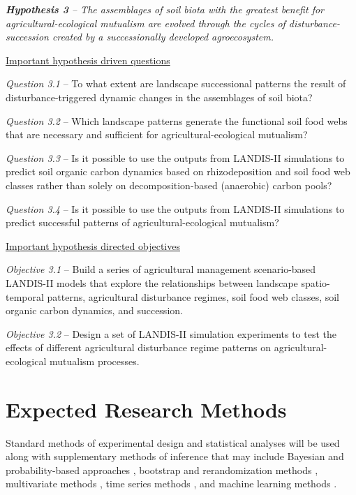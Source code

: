 \begin{description}
	
	\item{\textit{\textbf{Hypothesis 3} -- The assemblages of soil biota with the greatest benefit for agricultural-ecological mutualism are evolved through the cycles of disturbance-succession created by a successionally developed agroecosystem.}}
	
	\underline{Important hypothesis driven questions}
	\begin{description}
		\item{\textit{Question 3.1} -- To what extent are landscape successional patterns the result of disturbance-triggered dynamic changes in the assemblages of soil biota?}
		\item{\textit{Question 3.2} -- Which landscape patterns generate the functional soil food webs that are necessary and sufficient for agricultural-ecological mutualism?}
		\item{\textit{Question 3.3} -- Is it possible to use the outputs from LANDIS-II simulations to predict soil organic carbon dynamics based on rhizodeposition and soil food web classes rather than solely on decomposition-based (anaerobic) carbon pools?}
		\item{\textit{Question 3.4} -- Is it possible to use the outputs from LANDIS-II simulations to predict successful patterns of agricultural-ecological mutualism?}
	\end{description}
	
	\underline{Important hypothesis directed objectives}
	\begin{description}
	\item{\textit{Objective 3.1} -- Build a series of agricultural management scenario-based LANDIS-II models that explore the relationships between landscape spatio-temporal patterns, agricultural disturbance regimes, soil food web classes, soil organic carbon dynamics, and succession.}
	\item{\textit{Objective 3.2} -- Design a set of LANDIS-II simulation experiments to test the effects of different agricultural disturbance regime patterns on agricultural-ecological mutualism processes.}	
	\end{description}

\end{description}

\section{Expected Research Methods}
Standard methods of experimental design \citep{montgomery_design_2013} and statistical analyses \citep{R_computing} will be used along with supplementary methods of inference that may include Bayesian and probability-based approaches \citep{hoff_first_2009, lunn_bugs_2013, jaynes_probability_2003}, bootstrap and rerandomization methods \citep {lunneborg_data_2000}, multivariate methods \citep{johnson_applied_2007}, time series methods \citep{shumway_time_2011}, and machine learning methods \citep{alpaydin_introduction_2014}.\\

